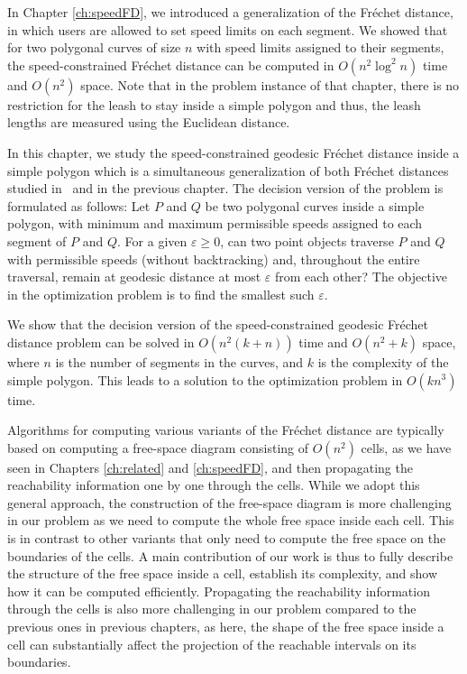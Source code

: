 \documentclass[12pt]{dalthesis}
\newcommand{\gee}{\geqslant}
\newcommand{\eps}{\varepsilon}
\newcommand{\Frechet}{Fr\'echet }
\begin{document}
In Chapter \ref{ch:speedFD}, we
introduced a generalization of the \Frechet distance,
in which users are allowed to set speed limits on each segment.
We showed that
for two polygonal curves of size $n$ with
speed limits assigned to their segments,
the speed-constrained \Frechet distance 
can be computed in $O(n^2 \log^2 n)$ time and $O(n^2)$ space. 
Note that in the problem instance of that chapter, there is no restriction for the leash to stay inside a simple polygon 
and thus, the leash lengths are measured using  the Euclidean distance.


In this chapter, we study the speed-constrained geodesic \Frechet distance inside a simple polygon
which is a simultaneous generalization of both 
\Frechet distances studied in~\cite{WenkC08a} and in the previous
chapter.
The decision version of the problem is formulated as follows:
Let $P$ and $Q$ be two polygonal curves inside a simple polygon, with minimum and maximum permissible speeds assigned to each segment of $P$ and $Q$.
For a given $\eps \gee 0$, 
can two point objects traverse
$P$ and $Q$ with permissible speeds (without backtracking) and, 
throughout the entire traversal, remain at geodesic distance at 
most $\eps$ from each other? The objective in the 
optimization problem is to find the smallest such $\eps$. 

We show that the decision version of the speed-constrained geodesic \Frechet distance problem 
can be solved in $O(n^2(k+n))$ time and $O(n^2+k)$ space,
where $n$ is the number of segments in the curves,
and $k$ is the complexity of the simple polygon.
This leads to a solution to the optimization problem
in $O(kn^3)$ time.

Algorithms for computing various variants of the \Frechet distance
are typically based on computing a free-space diagram consisting of $O(n^2)$ cells,
as we have seen in Chapters \ref{ch:related} and 
\ref{ch:speedFD},
and then propagating the reachability information 
one by one through the cells. While we adopt this general approach, 
the construction of the free-space diagram is more challenging in our problem
as we need to compute the whole free space inside each cell.
This is in contrast to other variants that only need to compute the free space on the boundaries of the cells.
A main contribution of our work is thus to 
fully describe the structure of the free space inside a cell,
establish its complexity,
and show how it can be computed efficiently.
Propagating the reachability information through the cells is also
more challenging  in our problem compared to the previous ones in previous chapters, 
as here, the shape of the free space inside a cell can
substantially affect the projection of the reachable intervals on its boundaries.
\end{document}
